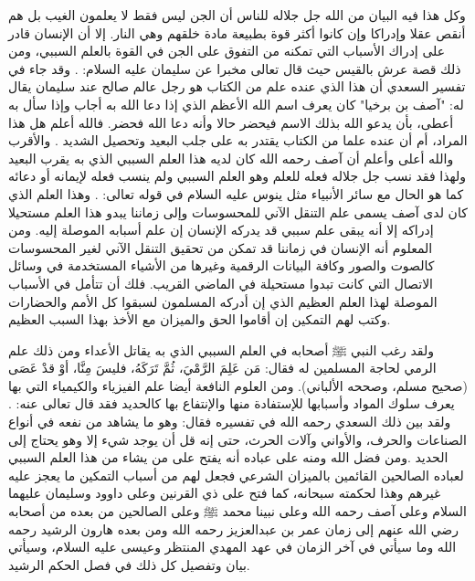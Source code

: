 وكل هذا فيه البيان من الله جل جلاله للناس أن الجن ليس فقط لا يعلمون الغيب بل هم أنقص عقلا وإدراكا وإن كانوا أكثر قوة بطبيعة مادة خلقهم وهي النار. إلا أن الإنسان قادر على إدراك الأسباب التي تمكنه من التفوق على الجن في القوة بالعلم السببي، ومن ذلك قصة عرش بالقيس حيث قال تعالى مخبرا عن سليمان عليه السلام:
\quranayah*[27][38-40]{\footnotesize \surahname*[27]}. وقد جاء في تفسير السعدي أن هذا الذي عنده علم من الكتاب هو رجل عالم صالح عند سليمان يقال له: "آصف بن برخيا" كان يعرف اسم الله الأعظم الذي إذا دعا الله به أجاب وإذا سأل به أعطى، بأن يدعو الله بذلك الاسم فيحضر حالا وأنه دعا الله فحضر. فالله أعلم هل هذا المراد، أم أن عنده علما من الكتاب يقتدر به على جلب البعيد وتحصيل الشديد \cite{tafsir_Saadi}. والأقرب والله أعلى وأعلم أن آصف رحمه الله كان لديه هذا العلم السببي الذي به يقرب البعيد ولهذا فقد نسب جل جلاله فعله للعلم وهو العلم السببي ولم ينسب فعله لإيمانه أو دعائه كما هو الحال مع سائر الأنبياء مثل ينوس عليه السلام في قوله تعالى:
\quranayah*[21][88]{\footnotesize \surahname*[21]}. وهذا العلم الذي كان لدى آصف يسمى علم التنقل الآني للمحسوسات وإلى زماننا يبدو هذا العلم مستحيلا إدراكه إلا أنه يبقى علم سببي قد يدركه الإنسان إن علم أسبابه الموصلة إليه. ومن المعلوم أنه الإنسان في زماننا قد تمكن من تحقيق التنقل الآني لغير المحسوسات كالصوت والصور وكافة البيانات الرقمية وغيرها من الأشياء المستخدمة في وسائل الاتصال التي كانت تبدوا مستحيلة في الماضي القريب. فلك أن تتأمل في الأسباب الموصلة لهذا العلم العظيم الذي إن أدركه المسلمون لسبقوا كل الأمم والحضارات وكتب لهم التمكين إن أقاموا الحق والميزان مع الأخذ بهذا السبب العظيم.

 ولقد رغب النبي ﷺ أصحابه في العلم السببي الذي به يقاتل الأعداء ومن ذلك علم الرمي لحاجة المسلمين له فقال: مَن عَلِمَ الرَّمْيَ، ثُمَّ تَرَكَهُ، فليسَ مِنَّا، أوْ قدْ عَصَى {\footnotesize (صحيح مسلم، وصححه الألباني)}. ومن العلوم النافعة أيضا علم الفيزياء والكيمياء التي بها يعرف سلوك المواد وأسبابها للإستفادة منها والإنتفاع بها كالحديد فقد قال تعالى عنه: \quranayah*[57][25][12-18]{\footnotesize \surahname*[57]}. ولقد بين ذلك السعدي رحمه الله في تفسيره فقال: وهو ما يشاهد من نفعه في أنواع الصناعات والحرف، والأواني وآلات الحرث، حتى إنه قل أن يوجد شيء إلا وهو يحتاج إلى الحديد \cite{tafsir_Saadi}.ومن فضل الله ومنه على عباده أنه يفتح على من يشاء من هذا العلم السببي لعباده الصالحين القائمين بالميزان الشرعي فجعل لهم من أسباب التمكين ما يعجز عليه غيرهم وهذا لحكمته سبحانه، كما فتح على ذي القرنين  وعلى داوود وسليمان عليهما السلام وعلى آصف رحمه الله وعلى نبينا محمد ﷺ وعلى الصالحين من بعده من أصحابه رضي الله عنهم إلى زمان عمر بن عبدالعزيز رحمه الله ومن بعده هارون الرشيد رحمه الله وما سيأتي في آخر الزمان في عهد المهدي المنتظر وعيسى عليه السلام، وسيأتي بيان وتفصيل كل ذلك في فصل الحكم الرشيد. 


